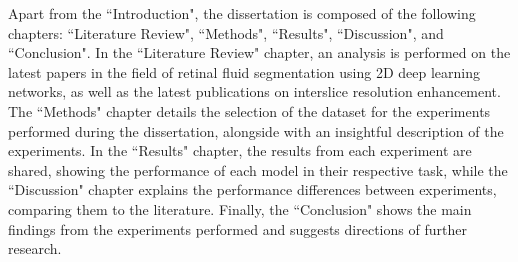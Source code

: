 Apart from the ``Introduction", the dissertation is composed of the following chapters: ``Literature Review", ``Methods", ``Results", ``Discussion", and ``Conclusion". In the ``Literature Review" chapter, an analysis is performed on the latest papers in the field of retinal fluid segmentation using 2D deep learning networks, as well as the latest publications on interslice resolution enhancement. The ``Methods" chapter details the selection of the dataset for the experiments performed during the dissertation, alongside with an insightful description of the experiments. In the ``Results" chapter, the results from each experiment are shared, showing the performance of each model in their respective task, while the ``Discussion" chapter explains the performance differences between experiments, comparing them to the literature. Finally, the ``Conclusion" shows the main findings from the experiments performed and suggests directions of further research.
